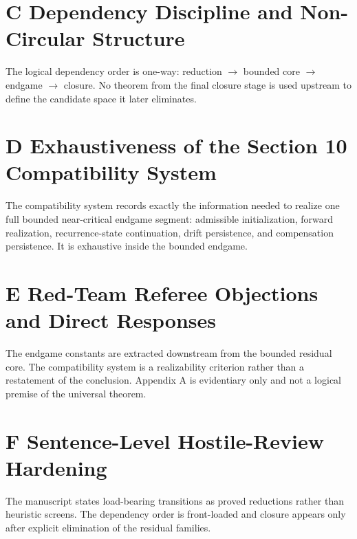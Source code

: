 \documentclass[11pt]{article}
\theoremstyle{definition}
\begin{document}
\section*{C Dependency Discipline and Non-Circular Structure}
The logical dependency order is one-way: reduction $\to$ bounded core $\to$ endgame $\to$ closure. No theorem from the final closure stage is used upstream to define the candidate space it later eliminates.

\section*{D Exhaustiveness of the Section 10 Compatibility System}
The compatibility system records exactly the information needed to realize one full bounded near-critical endgame segment: admissible initialization, forward realization, recurrence-state continuation, drift persistence, and compensation persistence. It is exhaustive inside the bounded endgame.

\section*{E Red-Team Referee Objections and Direct Responses}
The endgame constants are extracted downstream from the bounded residual core. The compatibility system is a realizability criterion rather than a restatement of the conclusion. Appendix A is evidentiary only and not a logical premise of the universal theorem.

\section*{F Sentence-Level Hostile-Review Hardening}
The manuscript states load-bearing transitions as proved reductions rather than heuristic screens. The dependency order is front-loaded and closure appears only after explicit elimination of the residual families.
\end{document}
